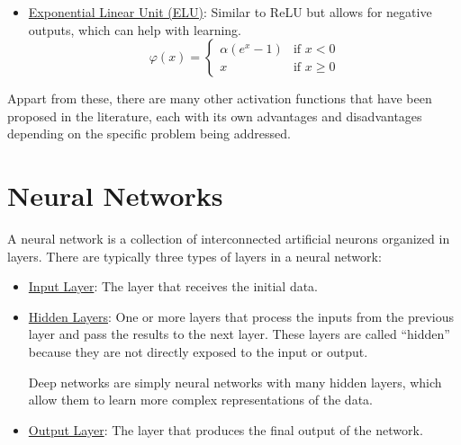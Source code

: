 \begin{itemize}
    \item \ul{Exponential Linear Unit (ELU)}: Similar to ReLU but allows for negative outputs, which can help with learning.
    \begin{equation*}
        \varphi(x) = \begin{cases}
            \alpha (e^x - 1) & \text{if } x < 0 \\
            x & \text{if } x \geq 0
        \end{cases}
    \end{equation*}
\end{itemize}

Appart from these, there are many other activation functions that have been proposed in the literature, each with its own advantages and disadvantages depending on the specific problem being addressed.

\section{Neural Networks}

A neural network is a collection of interconnected artificial neurons organized in layers. There are typically three types of layers in a neural network:
\begin{itemize}
    \item \ul{Input Layer}: The layer that receives the initial data.
    \item \ul{Hidden Layers}: One or more layers that process the inputs from the previous layer and pass the results to the next layer. These layers are called ``hidden'' because they are not directly exposed to the input or output.
    
    Deep networks are simply neural networks with many hidden layers, which allow them to learn more complex representations of the data.
    \item \ul{Output Layer}: The layer that produces the final output of the network.
\end{itemize}

